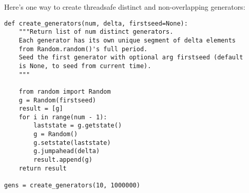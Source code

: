 Here's one way to create threadsafe distinct and non-overlapping generators:

\begin{verbatim}
def create_generators(num, delta, firstseed=None):
    """Return list of num distinct generators.
    Each generator has its own unique segment of delta elements
    from Random.random()'s full period.
    Seed the first generator with optional arg firstseed (default
    is None, to seed from current time).
    """

    from random import Random
    g = Random(firstseed)
    result = [g]
    for i in range(num - 1):
        laststate = g.getstate()
        g = Random()
        g.setstate(laststate)
        g.jumpahead(delta)
        result.append(g)
    return result

gens = create_generators(10, 1000000)
\end{verbatim}

